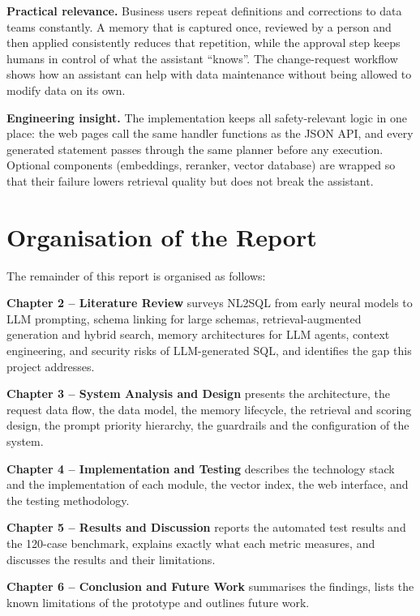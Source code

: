 \textbf{Practical relevance.} Business users repeat definitions and corrections to data
teams constantly. A memory that is captured once, reviewed by a person and then applied
consistently reduces that repetition, while the approval step keeps humans in control of
what the assistant ``knows''. The change-request workflow shows how an assistant can help
with data maintenance without being allowed to modify data on its own.

\textbf{Engineering insight.} The implementation keeps all safety-relevant logic in one
place: the web pages call the same handler functions as the JSON API, and every generated
statement passes through the same planner before any execution. Optional components
(embeddings, reranker, vector database) are wrapped so that their failure lowers retrieval
quality but does not break the assistant.

\section{Organisation of the Report}
The remainder of this report is organised as follows:

\textbf{Chapter 2 -- Literature Review} surveys NL2SQL from early neural models to LLM
prompting, schema linking for large schemas, retrieval-augmented generation and hybrid
search, memory architectures for LLM agents, context engineering, and security risks of
LLM-generated SQL, and identifies the gap this project addresses.

\textbf{Chapter 3 -- System Analysis and Design} presents the architecture, the request
data flow, the data model, the memory lifecycle, the retrieval and scoring design, the
prompt priority hierarchy, the guardrails and the configuration of the system.

\textbf{Chapter 4 -- Implementation and Testing} describes the technology stack and the
implementation of each module, the vector index, the web interface, and the testing
methodology.

\textbf{Chapter 5 -- Results and Discussion} reports the automated test results and the
120-case benchmark, explains exactly what each metric measures, and discusses the results
and their limitations.

\textbf{Chapter 6 -- Conclusion and Future Work} summarises the findings, lists the
known limitations of the prototype and outlines future work.
